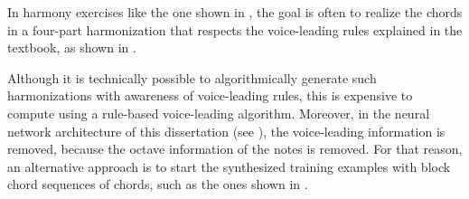 
In harmony exercises like the one shown in
, the goal is often to
\gls{realize} the chords in a four-part harmonization that
respects the voice-leading rules explained in the textbook,
as shown in . 


Although it is technically possible to algorithmically
generate such harmonizations with awareness of voice-leading
rules, this is expensive to compute using a rule-based
voice-leading
algorithm.
Moreover, in the neural network architecture of this
dissertation (see ), the voice-leading
information is removed, because the octave information of
the notes is removed. For that reason, an alternative
approach is to start the synthesized training examples with
block chord sequences of chords, such as the ones shown in
.

